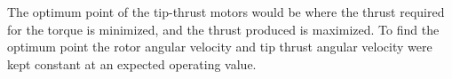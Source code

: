The optimum point of the tip-thrust motors would be where the thrust required for the torque is minimized, and the thrust produced is maximized. To find the optimum point the rotor angular velocity and tip thrust angular velocity were kept constant at an expected operating value.